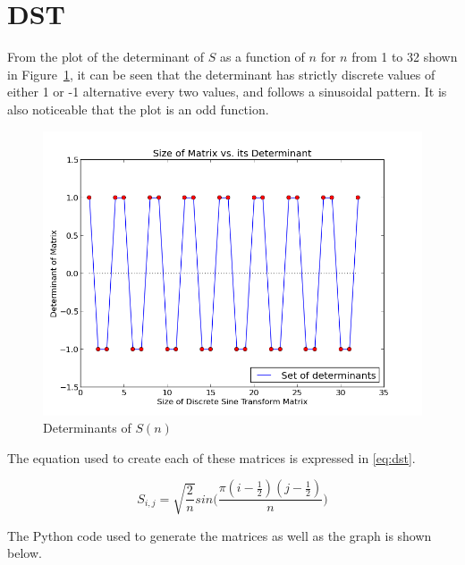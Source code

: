 \section{DST}

 From the plot of the determinant of $S$ as a function of $n$ for $n$ from 1 to 32 shown in Figure~\ref{fig:S(n)}, it can be seen that the determinant has strictly discrete values of either 1 or -1 alternative every two values, and follows a sinusoidal pattern. It is also noticeable that the plot is an odd function.

    \begin{figure}[h!]
        \centering
        \includegraphics[scale=0.6]{./img/dst_dets.png}
        \caption{Determinants of $S(n)$}
        \label{fig:S(n)}
    \end{figure}

The equation used to create each of these matrices is expressed in \eqref{eq:dst}.

    \begin{equation}
        \label{eq:dst}
        S_{i,j}=\sqrt{\frac{2}{n}}sin \bigg(
        \frac{\pi(i-\frac{1}{2})(j-\frac{1}{2})}{n}\bigg)
    \end{equation}

The Python code used to generate the matrices as well as the graph is shown below.

    

    
